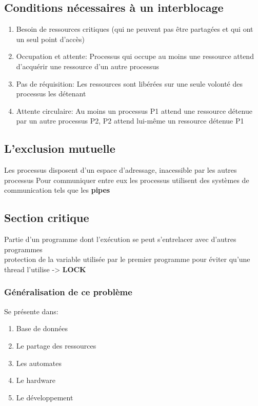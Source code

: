 \subsection{Conditions nécessaires à un interblocage}
\begin{enumerate}
\item Besoin de ressources critiques (qui ne peuvent pas être partagées et qui ont un seul point d'accès)
\item Occupation et attente: Processus qui occupe au moins une ressource attend d'acquérir une ressource d'un autre processus
\item Pas de réquisition: Les ressources sont libérées sur une seule volonté des processus les détenant
\item Attente circulaire: Au moins un processus P1 attend une ressource détenue par un autre processus P2, P2 attend lui-même un ressource détenue P1
\end{enumerate}

\subsection{L'exclusion mutuelle}
Les processus disposent d'un espace d'adressage, inacessible par les autres processus
Pour communiquer entre eux les processus utilisent des systèmes de communication tels que les \textbf{pipes}

\subsection{Section critique}
Partie d'un programme dont l'exécution se peut s'entrelacer avec d'autres programmes \\
protection de la variable utilisée par le premier programme pour éviter qu'une thread l'utilise -> \textbf{LOCK}

\subsubsection{Généralisation de ce problème}
Se présente dans:
\begin{enumerate}
\item Base de données
\item Le partage des ressources
\item Les automates
\item Le hardware
\item Le développement
\end{enumerate}

